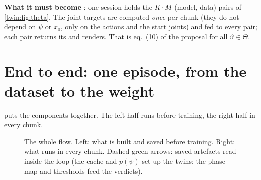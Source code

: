 \textbf{What it must become} \planned: one session holds the $K\cdot M$ (model, data) pairs of \cref{twin:fig:theta}. The joint targets are computed \emph{once} per chunk (they do not depend on $\psi$ or $x_0$, only on the actions and the start joints) and fed to every pair; each pair returns its  and renders. That is eq.~(10) of the proposal for all $\vartheta\in\Theta$.

\section{End to end: one episode, from the dataset to the weight}\label{twin:sec:flow}
 puts the components together. The left half runs before training, the right half in every chunk.

\begin{figure}[h]
\centering

\caption{The whole flow. Left: what is built and saved before training. Right: what runs in every chunk. Dashed green arrows: saved artefacts read inside the loop (the cache and $p(\psi)$ set up the twins; the phase map and thresholds feed the verdicts).}
\label{twin:fig:flow}
\end{figure}

